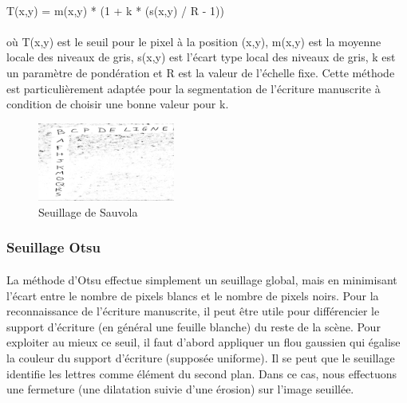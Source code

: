 \documentclass[a4paper]{article}
\begin{document}
				\paragraph{} \hspace*{0.4\linewidth}			T(x,y) = m(x,y) * (1 + k * (s(x,y) / R - 1))
				\paragraph{} où T(x,y) est le seuil pour le pixel à la position (x,y), m(x,y) est la moyenne locale des niveaux de gris, s(x,y) est l'écart type local des niveaux de gris, k est un paramètre de pondération et R est la valeur de l'échelle fixe.
				Cette méthode est particulièrement adaptée pour la segmentation de l'écriture manuscrite à condition de choisir une bonne valeur pour k. 

				\vspace*{1cm}


				\begin{figure}[h!]
					\centering
					\includegraphics[width=0.4\textwidth]{seuilSauvola.png}
					\caption{Seuillage de Sauvola}
					\label{fig:seuilSauvola}
				\end{figure}


				\hspace*{1.5cm}

				\subsubsection{Seuillage Otsu}
				\paragraph{} La méthode d'Otsu effectue simplement un seuillage global, mais en minimisant l'écart entre le nombre de pixels blancs et le nombre de pixels noirs. Pour la reconnaissance de l'écriture manuscrite, il peut être utile pour différencier le support d'écriture (en général une feuille blanche) du reste de la scène.
				Pour exploiter au mieux ce seuil, il faut d'abord appliquer un flou gaussien qui égalise la couleur du support d'écriture (supposée uniforme). 
				Il se peut que le seuillage identifie les lettres comme élément du second plan. Dans ce cas, nous effectuons une fermeture (une dilatation suivie d'une érosion) sur l'image seuillée.
				
\end{document}
